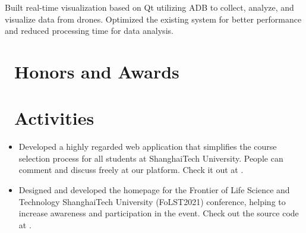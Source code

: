 \documentclass{resume}
\begin{document}
Built real-time visualization based on Qt utilizing ADB to collect, analyze, and visualize data from drones. Optimized the existing system for better performance and reduced processing time for data analysis.


\section{\faTrophy\ Honors and Awards}

\section{\faInfo\ Activities}


\begin{itemize}
  \item Developed a highly regarded web application that simplifies the course selection process for all students at ShanghaiTech University. People can comment and discuss freely at our platform. Check it out at .
  \item Designed and developed the homepage for the Frontier of Life Science and Technology ShanghaiTech University (FoLST2021) conference, helping to increase awareness and participation in the event. Check out the source code at .
\end{itemize}

\end{document}
